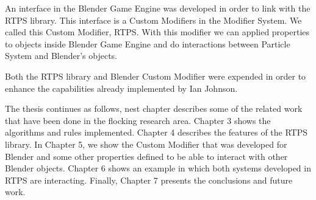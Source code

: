 An interface in the Blender Game Engine was developed in order to link with the RTPS library. This interface is a Custom Modifiers in the Modifier System. We called this Custom Modifier, RTPS. With this modifier we can applied properties to objects inside Blender Game Engine and do interactions between Particle System and Blender's objects.

Both the RTPS library and Blender Custom Modifier were expended in order to enhance the capabilities already implemented by Ian Johnson.


The thesis continues as follows, nest chapter describes some of the related work that have been done in the flocking research area. Chapter 3 shows the algorithms and rules implemented. Chapter 4 describes the features of the RTPS library. In Chapter 5, we show the Custom Modifier that was developed for Blender and some other properties defined to be able to interact with other Blender objects. Chapter 6 shows an example in which both systems developed in RTPS are interacting. Finally, Chapter 7 presents the conclusions and future work. 
